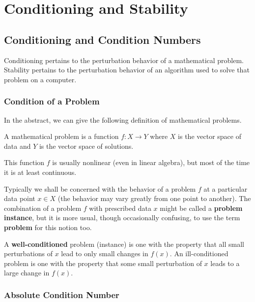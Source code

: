 \part{Conditioning and Stability}
\chapter{Conditioning and Condition Numbers}

Conditioning pertains to the perturbation behavior of a mathematical problem. Stability pertains to the perturbation behavior of an algorithm used to solve that problem on a computer.

\section{Condition of a Problem} 
In the abstract, we can give the following definition of mathematical problems. 


\begin{definition}
[Problem]
\label{def: Problem}
A mathematical problem is a function $f:X\to Y$ where $X$ is the vector space of data and $Y$ is the vector space of solutions.
\end{definition}


This function $f$ is usually nonlinear (even in linear algebra), but most of the time it is at least continuous.

Typically we shall be concerned with the behavior of a problem $f$ at a particular data point $x \in X$ (the behavior may vary greatly from one point to another). The combination of a problem $f$ with prescribed data $x$ might be called a \textbf{problem instance}, but it is more usual, though occasionally confusing, to use the term \textbf{problem} for this notion too.

A \textbf{well-conditioned} problem (instance) is one with the property that all small perturbations of $x$ lead to only small changes in $f(x)$. An ill-conditioned problem is one with the property that some small perturbation of $x$ leads to a large change in $f(x)$.

\section{Absolute Condition Number} 

